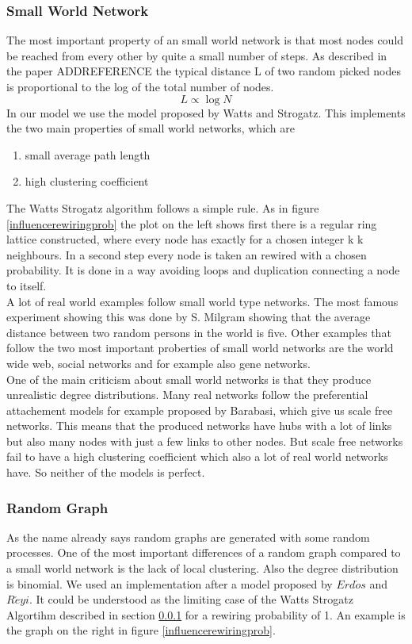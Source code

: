 \subsubsection{Small World Network}
\label{sec:smallworld}
The most important property of an small world network is that most nodes could be reached from every other by quite a small number of steps. As described in the paper ADDREFERENCE the typical distance L of two random picked nodes is proportional to the log of the total number of nodes.
\begin{equation}
L \propto \log N
\end{equation}
In our model we use the model proposed by Watts and Strogatz. This implements the two main properties of small world networks, which are
\begin{enumerate}
\item small average path length
\item high clustering coefficient
\end{enumerate}
The Watts Strogatz algorithm follows a simple rule. As in figure \ref{influencerewiringprob} the plot on the left shows first there is a regular ring lattice constructed, where every node has exactly for a chosen integer k k neighbours. In a second step every node is taken an rewired with a chosen probability. It is done in a way avoiding loops and duplication \ie connecting a node to itself.\\
A lot of real world examples follow small world type networks. The most famous experiment showing this was done by S. Milgram showing that the average distance between two random persons in the world is five. Other examples that follow the two most important proberties of small world networks are the world wide web, social networks and for example also gene networks. \\
One of the main criticism about small world networks is that they produce unrealistic degree distributions. Many real networks follow the preferential attachement models for example proposed by Barabasi, which give us scale free networks. This means that the produced networks have hubs with a lot of links but also many nodes with just a few links to other nodes. But scale free networks fail to have a high clustering coefficient which also a lot of real world networks have. So neither of the models is perfect.

\subsubsection{Random Graph}
\label{sec:randomgraph}
As the name already says random graphs are generated with some random processes. One of the most important differences of a random graph compared to a small world network is the lack of local clustering. Also the degree distribution is binomial. We used an implementation after a model proposed by $Erd\acute{o}s$ and $R\acute{e}yi$. It could be understood as the limiting case of the Watts Strogatz Algortihm described in section \ref{sec:smallworld} for a rewiring probability of 1. An example is the graph on the right in figure \ref{influencerewiringprob}.